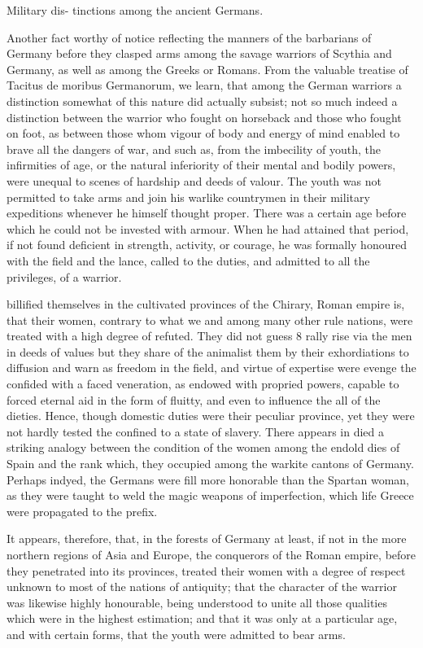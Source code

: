 \documentclass{article}
\begin{document}
Military dis-
tinctions among the
ancient Germans.

Another fact worthy of notice reflecting the manners of the barbarians of Germany before they clasped arms among the savage warriors of Scythia and Germany, as well as among the Greeks or Romans. From the valuable treatise of Tacitus de moribus Germanorum, we learn, that among the German warriors a distinction somewhat of this nature did actually subsist; not so much indeed a distinction between the warrior who fought on horseback and those who fought on foot, as between those whom vigour of body and energy of mind enabled to brave all the dangers of war, and such as, from the imbecility of youth, the infirmities of age, or the natural inferiority of their mental and bodily powers, were unequal to scenes of hardship and deeds of valour. The youth was not permitted to take arms and join his warlike countrymen in their military expeditions whenever he himself thought proper. There was a certain age before which he could not be invested with armour. When he had attained that period, if not found deficient in strength, activity, or courage, he was formally honoured with the field and the lance, called to the duties, and admitted to all the privileges, of a warrior.

billified themselves in the cultivated provinces of the Chirary, Roman empire is, that their women, contrary to what we and among many other rule nations, were treated with a high degree of refuted. They did not guess 8 rally rise via the men in deeds of values but they share of the animalist them by their exhordiations to diffusion and warn as freedom in the field, and virtue of expertise were evenge the confided with a faced veneration, as endowed with propried powers, capable to forced eternal aid in the form of fluitty, and even to influence the all of the dieties. Hence, though domestic duties were their peculiar province, yet they were not hardly tested the confined to a state of slavery. There appears in died a striking analogy between the condition of the women among the endold dies of Spain and the rank which, they occupied among the warkite cantons of Germany. Perhaps indyed, the Germans were fill more honorable than the Spartan woman, as they were taught to weld the magic weapons of imperfection, which life Greece were propagated to the prefix.

It appears, therefore, that, in the forests of Germany at least, if not in the more northern regions of Asia and Europe, the conquerors of the Roman empire, before they penetrated into its provinces, treated their women with a degree of respect unknown to most of the nations of antiquity; that the character of the warrior was likewise highly honourable, being understood to unite all those qualities which were in the highest estimation; and that it was only at a particular age, and with certain forms, that the youth were admitted to bear arms.
\end{document}
